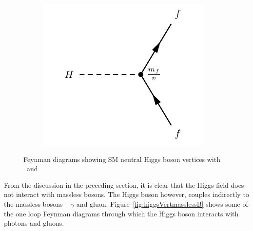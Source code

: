 \begin{figure}[!h]
\begin{subfigure}{0.225\textwidth}
   \includegraphics[width=\textwidth]{figures/hFerm.pdf}
\end{subfigure}%
\caption{Feynman diagrams showing SM neutral Higgs boson vertices with \Zboson\ and \Wpm}
\label{fig:higgsVertgauge}
\end{figure}

\par From the discussion in the preceding section, it is clear that the Higgs field does 
not interact with massless bosons. The Higgs boson however, couples indirectly to the massless 
bosons -- $\gamma$ and gluon. Figure~\ref{fig:higgsVertmasslessB} shows some of the one 
loop Feynman diagrams through which the Higgs boson interacts with photons and gluons. 

